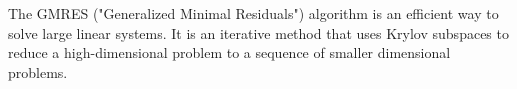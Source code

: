 \label{lab:GMRES}

The GMRES ("Generalized Minimal Residuals") algorithm is an efficient way to solve large linear systems.
It is an iterative method that uses Krylov subspaces to reduce a high-dimensional problem to a sequence of smaller dimensional
problems.

